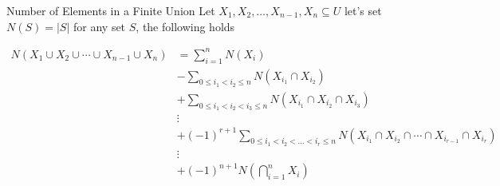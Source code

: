 \documentclass{standalone}
\begin{document}
\begin{theo*}{Number of Elements in a Finite Union}
Let $X_{1} , X_{2} , \dotsc  , X_{n - 1} , X_{n} \subseteq  U $ let's set $N\left(S\right) = \left| S \right|$ for any set $S$, the following holds

\begin{align*}
  N\left( X_{1} \cup X_{2} \cup \dotsb  \cup X_{n - 1} \cup X_{n}\right) &= \sum_{i=1}^{n} N\left(X_{i}\right) \\ 
                                                                                                               &- \sum_{0 \le i_{1} < i_{2} \le n} N\left(X_{i_{1}} \cap X_{i_{2}}\right)  \\
                                                                                                               &+ \sum_{0 \le i_{1} < i_{2} < i_{3} \le n} N\left(X_{i_{1}} \cap X_{i_{2}} \cap X_{i_{3}}\right) \\
                                                                                                               &\vdots \\
                                                                                                               &+ \left( -1 \right) ^{r  + 1} \sum_{0 \le i_{1} < i_{2} < \ldots < i_{r} \le n} N\left(X_{i_{1}} \cap X_{i_{2}} \cap \dotsb \cap X_{i_{r-1}} \cap X_{i_{r}}\right) \\
                                                                                                               &\vdots \\
                                                                                                               &+ \left( -1 \right) ^{ n  +  1}   N\left( \bigcap_{i=1}^{n} X_{i} \right)
\end{align*}



\end{theo*}
\end{document}
